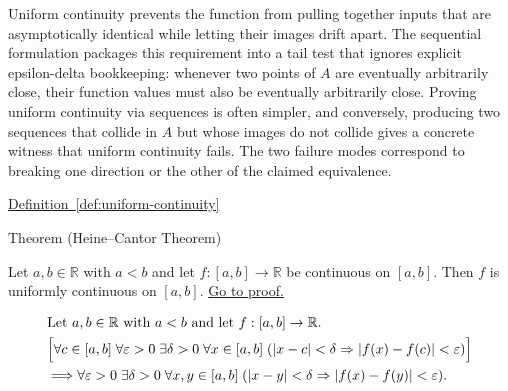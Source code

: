 \begin{remark*}[Interpretation]
Uniform continuity prevents the function from pulling together inputs that are asymptotically identical while letting their images drift apart. The sequential formulation packages this requirement into a tail test that ignores explicit epsilon-delta bookkeeping: whenever two points of $A$ are eventually arbitrarily close, their function values must also be eventually arbitrarily close. Proving uniform continuity via sequences is often simpler, and conversely, producing two sequences that collide in $A$ but whose images do not collide gives a concrete witness that uniform continuity fails. The two failure modes correspond to breaking one direction or the other of the claimed equivalence.
\end{remark*}

\begin{dependencies}
\hyperref[def:uniform-continuity]{Definition~\ref*{def:uniform-continuity}}
\end{dependencies}


\begin{theorembox}{Theorem (Heine--Cantor Theorem)}
\begin{theorem}
\label{thm:heine-cantor}
Let $a,b \in \mathbb{R}$ with $a<b$ and let $f:[a,b]\to\mathbb{R}$ be continuous on $[a,b]$. Then $f$ is uniformly continuous on $[a,b]$.
\hyperref[prf:heine-cantor]{Go to proof.}
\end{theorem}
\end{theorembox}

\begin{remark*}
\[
\begin{aligned}
&\text{Let } a,b \in \mathbb{R} \text{ with } a<b \text{ and let } f:[a,b]\to\mathbb{R}.\\
&\Bigl[\forall c \in [a,b]\; \forall \varepsilon>0\; \exists \delta>0\; \forall x \in [a,b]\;(|x-c|<\delta \Rightarrow |f(x)-f(c)|<\varepsilon)\Bigr]\\
&\Longrightarrow \forall \varepsilon>0\; \exists \delta>0\; \forall x,y \in [a,b]\;(|x-y|<\delta \Rightarrow |f(x)-f(y)|<\varepsilon).
\end{aligned}
\]
\end{remark*}

